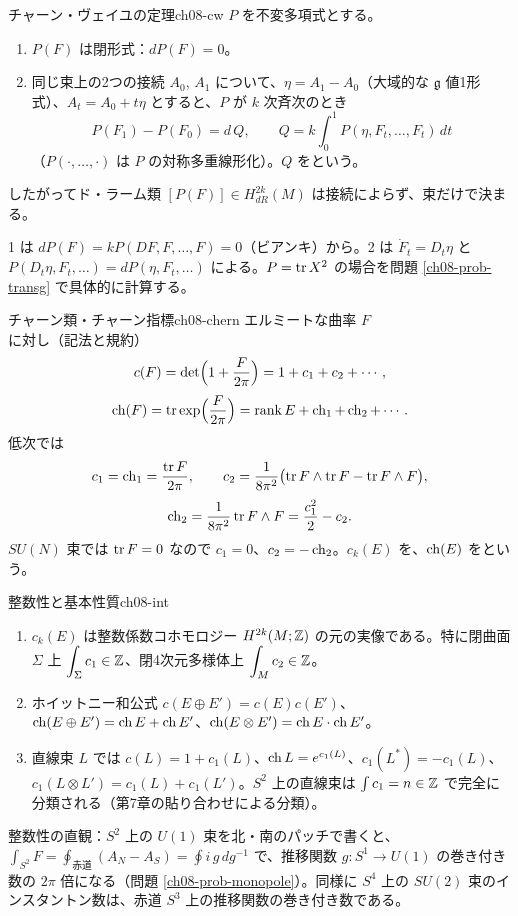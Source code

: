 \begin{mythm}{チャーン・ヴェイユの定理}{ch08-cw}
$P$ を不変多項式とする。
\begin{enumerate}
\item $P(F)$ は閉形式：$dP(F)=0$。
\item 同じ束上の2つの接続 $A_0$, $A_1$ について、$\eta=A_1-A_0$（大域的な $\mathfrak g$ 値1形式）、$A_t=A_0+t\eta$ とすると、$P$ が $k$ 次斉次のとき
\[
P(F_1)-P(F_0)=d\,Q,\qquad Q=k\int_0^1P(\eta,F_t,\dots,F_t)\,dt
\]
（$P(\cdot,\dots,\cdot)$ は $P$ の対称多重線形化）。$Q$ をという。
\end{enumerate}
したがってド・ラーム類 $[P(F)]\in H^{2k}_{dR}(M)$ は接続によらず、束だけで決まる。
\end{mythm}
\begin{note}
1 は $dP(F)=kP(DF,F,\dots,F)=0$（ビアンキ）から。2 は $\dot F_t=D_t\eta$ と $P(D_t\eta,F_t,\dots)=dP(\eta,F_t,\dots)$ による。$P=\tr X^2$ の場合を問題 \ref{ch08-prob-transg} で具体的に計算する。
\end{note}

\begin{mydef}{チャーン類・チャーン指標}{ch08-chern}
エルミートな曲率 $F$ に対し（記法と規約）
\[
c(F)=\det\Bigl(1+\frac{F}{2\pi}\Bigr)=1+c_1+c_2+\cdots,\]\[\operatorname{ch}(F)=\tr\exp\Bigl(\frac{F}{2\pi}\Bigr)=\operatorname{rank}E+\operatorname{ch}_1+\operatorname{ch}_2+\cdots.
\]
低次では
\[
c_1=\operatorname{ch}_1=\frac{\tr F}{2\pi},\qquad c_2=\frac{1}{8\pi^2}\bigl(\tr F\wedge\tr F-\tr F\wedge F\bigr),\]\[\operatorname{ch}_2=\frac{1}{8\pi^2}\tr F\wedge F=\frac{c_1^2}{2}-c_2 .
\]
$SU(N)$ 束では $\tr F=0$ なので $c_1=0$、$c_2=-\operatorname{ch}_2$。$c_k(E)$ を、$\operatorname{ch}(E)$ をという。
\end{mydef}

\begin{mythm}{整数性と基本性質}{ch08-int}
\begin{enumerate}
\item $c_k(E)$ は整数係数コホモロジー $H^{2k}(M;\mathbb{Z})$ の元の実像である。特に閉曲面 $\Sigma$ 上 $\displaystyle\int_\Sigma c_1\in\mathbb{Z}$、閉4次元多様体上 $\displaystyle\int_Mc_2\in\mathbb{Z}$。
\item ホイットニー和公式 $c(E\oplus E')=c(E)c(E')$、$\operatorname{ch}(E\oplus E')=\operatorname{ch} E+\operatorname{ch} E'$、$\operatorname{ch}(E\otimes E')=\operatorname{ch} E\cdot\operatorname{ch} E'$。
\item 直線束 $L$ では $c(L)=1+c_1(L)$、$\operatorname{ch} L=e^{c_1(L)}$、$c_1(L^*)=-c_1(L)$、$c_1(L\otimes L')=c_1(L)+c_1(L')$。$S^2$ 上の直線束は $\int c_1=n\in\mathbb{Z}$ で完全に分類される（第7章の貼り合わせによる分類）。
\end{enumerate}
\end{mythm}
整数性の直観：$S^2$ 上の $U(1)$ 束を北・南のパッチで書くと、$\int_{S^2}F=\oint_{\text{赤道}}(A_N-A_S)=\oint i\,g\,dg^{-1}$ で、推移関数 $g\colon S^1\to U(1)$ の巻き付き数の $2\pi$ 倍になる（問題 \ref{ch08-prob-monopole}）。同様に $S^4$ 上の $SU(2)$ 束のインスタントン数は、赤道 $S^3$ 上の推移関数の巻き付き数である。

